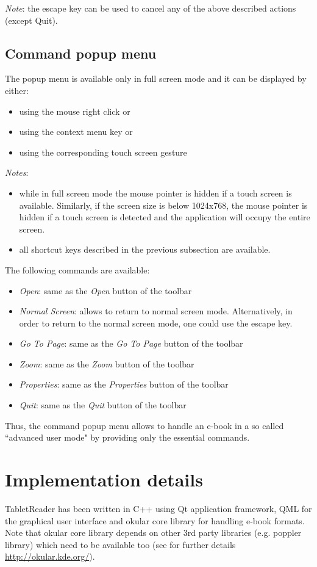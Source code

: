 \documentclass[journal,12pt]{IEEEtran}
\begin{document}
\textit{Note}: the escape key can be used to cancel any of the above described actions (except Quit).

\subsection{Command popup menu}
The popup menu is available only in full screen mode and it can be displayed by either:
\begin{itemize}
 \item using the mouse right click or
 \item using the context menu key or
 \item using the corresponding touch screen gesture
\end{itemize}

\textit{Notes}: 
\begin{itemize}
 \item while in full screen mode the mouse pointer is hidden if a touch screen is available. Similarly, if the screen size is below 1024x768, the mouse pointer is hidden if a touch screen is detected and the application will occupy the entire screen.
 \item all shortcut keys described in the previous subsection are available.
\end{itemize}

The following commands are available:
\begin{itemize}
 \item \textit{Open}: same as the \textit{Open} button of the toolbar
 \item \textit{Normal Screen}: allows to return to normal screen mode. Alternatively, in order to return to the normal screen mode, one could use the escape key.
 \item \textit{Go To Page}: same as the \textit{Go To Page} button of the toolbar
 \item \textit{Zoom}: same as the \textit{Zoom} button of the toolbar
 \item \textit{Properties}: same as the \textit{Properties} button of the toolbar
 \item \textit{Quit}: same as the \textit{Quit} button of the toolbar
\end{itemize}
Thus, the command popup menu allows to handle an e-book in a so called ``advanced user mode" by providing only the essential commands.

\section{Implementation details}
TabletReader has been written in C++ using Qt application framework, QML for the graphical user interface and okular core library for handling e-book formats. Note that okular core library depends on other 3rd party libraries (e.g. poppler library) which need to be available too (see for further details \url{http://okular.kde.org/}).
\end{document}
